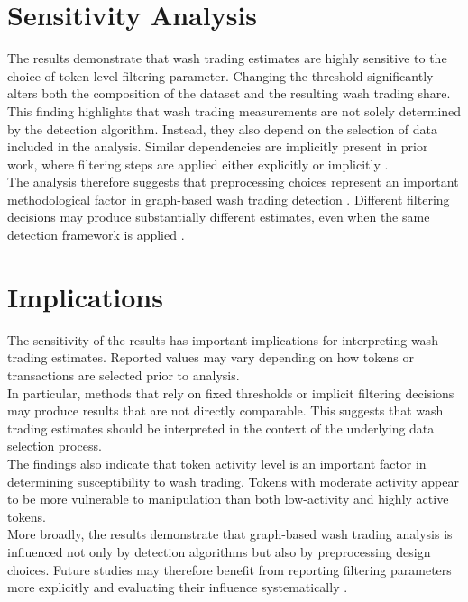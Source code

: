 \documentclass[language=english,thesis=bachelor,nosecondtitle,faculty=cb,onesided,13pt]{hsmw-thesis}
\begin{document}
	\section{Sensitivity Analysis}
The results demonstrate that wash trading estimates are highly sensitive to the choice of token-level filtering parameter. Changing the threshold significantly alters both the composition of the dataset and the resulting wash trading share.\\
This finding highlights that wash trading measurements are not solely determined by the detection algorithm. Instead, they also depend on the selection of data included in the analysis. Similar dependencies are implicitly present in prior work, where filtering steps are applied either explicitly or implicitly \cite{victor2021detecting, cui2023chain}.\\
The analysis therefore suggests that preprocessing choices represent an important methodological factor in graph-based wash trading detection \cite{victor2021detecting, cui2023chain}. Different filtering decisions may produce substantially different estimates, even when the same detection framework is applied \cite{victor2021detecting, cui2023chain}.

	\section{Implications}
The sensitivity of the results has important implications for interpreting wash trading estimates. Reported values may vary depending on how tokens or transactions are selected prior to analysis.\\
In particular, methods that rely on fixed thresholds or implicit filtering decisions may produce results that are not directly comparable. This suggests that wash trading estimates should be interpreted in the context of the underlying data selection process.\\
The findings also indicate that token activity level is an important factor in determining susceptibility to wash trading. Tokens with moderate activity appear to be more vulnerable to manipulation than both low-activity and highly active tokens.\\
More broadly, the results demonstrate that graph-based wash trading analysis is influenced not only by detection algorithms but also by preprocessing design choices. Future studies may therefore benefit from reporting filtering parameters more explicitly and evaluating their influence systematically \cite{victor2021detecting, cui2023chain}.
\end{document}
